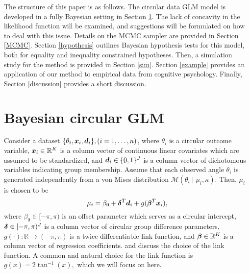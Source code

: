 The structure of this paper is as follows. The circular data GLM model is developed in a fully Bayesian setting in Section \ref{themodel}. The lack of concavity in the likelihood function will be examined, and suggestions will be formulated on how to deal with this issue. Details on the MCMC sampler are provided in Section \ref{MCMC}. Section \ref{hypothesis} outlines Bayesian hypothesis tests for this model, both for equality and inequality constrained hypotheses. Then, a simulation study for the method is provided in Section \ref{sim}. Section \ref{example} provides an application of our method to empirical data from cognitive psychology. Finally, Section \ref{discussion} provides a short discussion.




\section{Bayesian circular GLM}

\label{themodel}

Consider a dataset \( \{ \theta_i, \boldsymbol{x}_i, \boldsymbol{d}_i \}, (i = 1, \dots, n) \), where \( \theta_i  \) is a circular outcome variable, \( \boldsymbol{x}_i \in \mathbb{R}^K \) is a column vector of continuous linear covariates which are assumed to be standardized, and \( \boldsymbol{d}_i \in \{0, 1\}^J \) is a column vector of dichotomous variables indicating group membership. Assume that each observed angle $\theta_i$ is generated independently from a von Mises distribution \( \mathcal{M}(\theta_i \mid \mu_i, \kappa) \). Then, \( \mu_i \) is chosen to be
\begin{equation}
\mu_i = \beta_0 + \boldsymbol{\delta}^T \boldsymbol{d}_i + g(\boldsymbol{\beta}^T \boldsymbol{x}_i),
\end{equation}
where \( \beta_0 \in [-\pi, \pi) \) is an offset parameter which serves as a circular intercept, \( \boldsymbol{\delta} \in [-\pi, \pi)^J \) is a column vector of circular group difference parameters, \( g(\cdot) : \mathbb{R} \rightarrow (-\pi, \pi) \) is a twice differentiable link function, and \(\boldsymbol{\beta} \in \mathbb{R}^K \) is a column vector of regression coefficients. \citet{jammalamadaka2001topics} and \citet{fisher1992regression} discuss the choice of the link function. A common and natural choice for the link function is \( g(x) = 2 \tan^{-1}(x),\) which we will focus on here.

